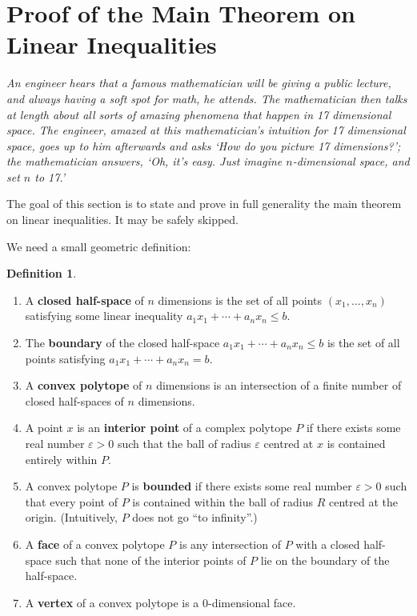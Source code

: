 \documentclass[a4paper,leqno]{article}
\numberwithin{equation}{section}
\theoremstyle{definition}
\newtheorem{defn}[equation]{Definition}
\theoremstyle{remark}
\begin{document}
\section{Proof of the Main Theorem on Linear Inequalities}
\begin{center}
  \emph{An engineer hears that a famous mathematician will be giving a public lecture, and always having a soft spot for math,
        he attends. The mathematician then talks at length about all sorts of amazing phenomena that happen in 17 dimensional space.
        The engineer, amazed at this mathematician's intuition for 17 dimensional space, goes up to him afterwards and asks `How do you
        picture 17 dimensions?'; the mathematician answers, `Oh, it's easy. Just imagine $n$-dimensional space, and set $n$ to 17.'}
\end{center}
The goal of this section is to state and prove in full generality the main theorem on linear inequalities. It may be safely skipped.

We need a small geometric definition:
\begin{defn}\leavevmode
  \begin{enumerate}
    \item A \textbf{closed half-space} of $ n $ dimensions is the set of all points $ (x_1, \dots, x_n) $ satisfying some linear
          inequality $ a_1 x_1 + \cdots + a_n x_n \leq b $.
    \item The \textbf{boundary} of the closed half-space $ a_1 x_1 + \cdots + a_n x_n \leq b $ is the set of all points
          satisfying $ a_1 x_1 + \cdots + a_n x_n = b $.
    \item A \textbf{convex polytope} of $ n $ dimensions is an intersection of a finite number of closed half-spaces of $ n $ dimensions.
    \item A point $ x$ is an \textbf{interior point} of a complex polytope $ P $ if there exists some real number $ \varepsilon > 0 $ such that the ball
          of radius $ \varepsilon $ centred at $ x $ is contained entirely within $ P $.
    \item A convex polytope $ P $ is \textbf{bounded} if there exists some real number $ \varepsilon > 0 $ such that every point of $ P $ is contained within
          the ball of radius $ R $  centred at the origin. (Intuitively, $ P $ does not go ``to infinity''.)
    \item A \textbf{face} of a convex polytope $ P $ is any intersection of $ P $ with a closed half-space such that none of the interior points of $ P $
          lie on the boundary of the half-space.
    \item A \textbf{vertex} of a convex polytope is a 0-dimensional face.
  \end{enumerate}
\end{defn}
\end{document}
